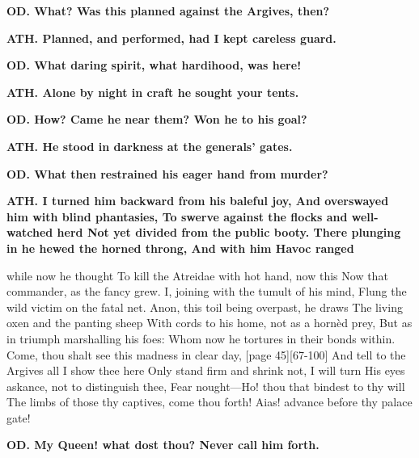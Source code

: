 \documentclass[11pt,letter]{book}
\begin{document}
\par \textbf{OD. What? Was this planned against the Argives, then?}
\par 

\par \textbf{ATH. Planned, and performed, had I kept careless guard.}
\par 

\par \textbf{OD. What daring spirit, what hardihood, was here!}
\par 

\par \textbf{ATH. Alone by night in craft he sought your tents.}
\par 

\par \textbf{OD. How? Came he near them? Won he to his goal?}
\par 

\par \textbf{ATH. He stood in darkness at the generals’ gates.}
\par 

\par \textbf{OD. What then restrained his eager hand from murder?}
\par 

\par \textbf{ATH. I turned him backward from his baleful joy, And overswayed him with blind phantasies, To swerve against the flocks and well-watched herd Not yet divided from the public booty. There plunging in he hewed the horned throng, And with him Havoc ranged}
\par   while now he thought To kill the Atreidae with hot hand, now this Now that commander, as the fancy grew. I, joining with the tumult of his mind, Flung the wild victim on the fatal net. Anon, this toil being overpast, he draws The living oxen and the panting sheep With cords to his home, not as a hornèd prey, But as in triumph marshalling his foes:  Whom now he tortures in their bonds within. Come, thou shalt see this madness in clear day, [page 45][67-100] And tell to the Argives all I show thee here Only stand firm and shrink not, I will turn His eyes askance, not to distinguish thee, Fear nought—Ho! thou that bindest to thy will The limbs of those thy captives, come thou forth! Aias! advance before thy palace gate!

\par \textbf{OD. My Queen! what dost thou? Never call him forth.}
\par 
\end{document}
